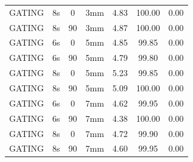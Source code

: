 \documentclass[type=dr, dr=rernat, accentcolor=tud7b,colorbacktitle, bigchapter, openright, twoside, 12pt ]{tudthesis}
\begin{document}
\begin{table}[H]
\begin{tabular}{|c||c|c|c||c|c|c|}
GATING & 8s & 0 & 3mm & 4.83 & 100.00 & 0.00 \\
GATING & 8s & 90 & 3mm & 4.87 & 100.00 & 0.00 \\
GATING & 6s & 0 & 5mm & 4.85 & 99.85 & 0.00 \\
GATING & 6s & 90 & 5mm & 4.79 & 99.80 & 0.00 \\
GATING & 8s & 0 & 5mm & 5.23 & 99.85 & 0.00 \\
GATING & 8s & 90 & 5mm & 5.09 & 100.00 & 0.00 \\
GATING & 6s & 0 & 7mm & 4.62 & 99.95 & 0.00 \\
GATING & 6s & 90 & 7mm & 4.38 & 100.00 & 0.00 \\
GATING & 8s & 0 & 7mm & 4.72 & 99.90 & 0.00 \\
GATING & 8s & 90 & 7mm & 4.60 & 99.95 & 0.00 \\
    \hline\hline 
  \end{tabular}
\end{table}

\newpage
\end{document}
